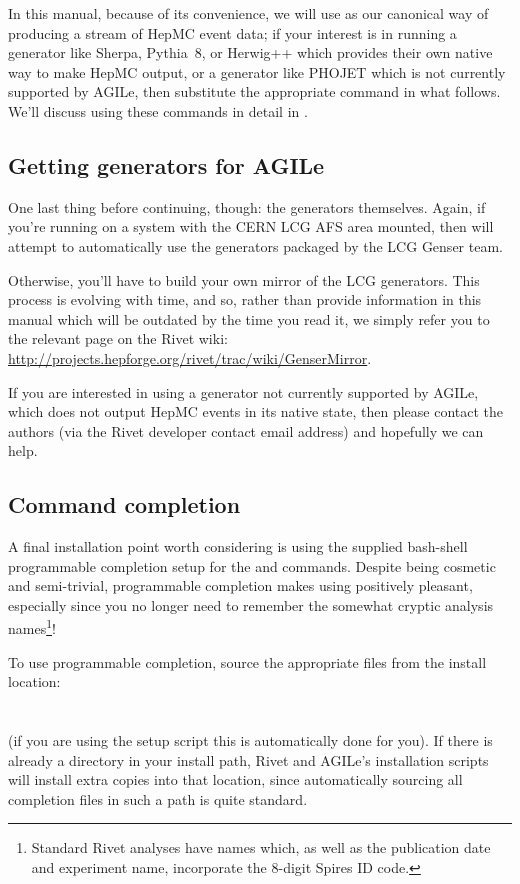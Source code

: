 \documentclass{JHEP3}
\begin{document}
In this manual, because of its convenience, we will use  as our
canonical way of producing a stream of HepMC event data; if your interest is in
running a generator like Sherpa\cite{Gleisberg:2008ta},
Pythia~8\cite{Sjostrand:2007gs,Sjostrand:2008vc}, or Herwig++\cite{Bahr:2008pv}
which provides their own native way to make HepMC output, or a generator like
PHOJET which is not currently supported by AGILe, then substitute the
appropriate command in what follows.  We'll discuss using these commands in
detail in .


\subsection{Getting generators for AGILe}
\label{sec:genser}

One last thing before continuing, though: the generators themselves. Again, if
you're running on a system with the CERN LCG AFS area mounted, then
 will attempt to automatically use the generators packaged by the
LCG Genser team.

Otherwise, you'll have to build your own mirror of the LCG generators. This
process is evolving with time, and so, rather than provide information in this
manual which will be outdated by the time you read it, we simply refer you to
the relevant page on the Rivet wiki:
\url{http://projects.hepforge.org/rivet/trac/wiki/GenserMirror}.

If you are interested in using a generator not currently supported by AGILe,
which does not output HepMC events in its native state, then please contact the
authors (via the Rivet developer contact email address) and hopefully we can
help.


\subsection{Command completion}

A final installation point worth considering is using the supplied bash-shell
programmable completion setup for the  and 
commands. Despite being cosmetic and semi-trivial, programmable completion makes
using  positively pleasant, especially since you no longer need to
remember the somewhat cryptic analysis names\footnote{Standard Rivet analyses
  have names which, as well as the publication date and experiment name,
  incorporate the 8-digit Spires ID code.}!

To use programmable completion, source the appropriate files from the install
location:\\
\\
\\
(if you are using the setup script  this is automatically
done for you).
If there is already a  directory in
your install path, Rivet and AGILe's installation scripts will install extra
copies into that location, since automatically sourcing all completion files in
such a path is quite standard.
\end{document}
